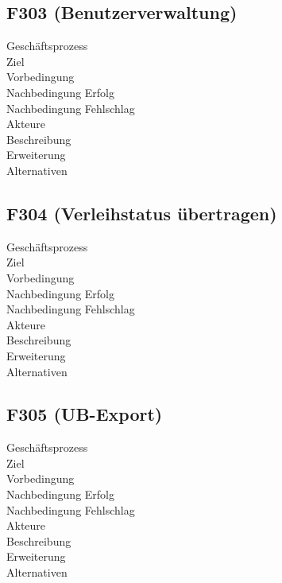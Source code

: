 \subsection{F303 (Benutzerverwaltung)}
\begin{description}
  \item[Geschäftsprozess]
  \item[Ziel]
  \item[Vorbedingung]
  \item[Nachbedingung Erfolg]
  \item[Nachbedingung Fehlschlag]
  \item[Akteure]
  \item[Beschreibung]
  \item[Erweiterung]
  \item[Alternativen]
\end{description}

\subsection{F304 (Verleihstatus übertragen)}
\begin{description}
  \item[Geschäftsprozess]
  \item[Ziel]
  \item[Vorbedingung]
  \item[Nachbedingung Erfolg]
  \item[Nachbedingung Fehlschlag]
  \item[Akteure]
  \item[Beschreibung]
  \item[Erweiterung]
  \item[Alternativen]
\end{description}

\subsection{F305 (UB-Export)}
\begin{description}
  \item[Geschäftsprozess]
  \item[Ziel]
  \item[Vorbedingung]
  \item[Nachbedingung Erfolg]
  \item[Nachbedingung Fehlschlag]
  \item[Akteure]
  \item[Beschreibung]
  \item[Erweiterung]
  \item[Alternativen]
\end{description}

